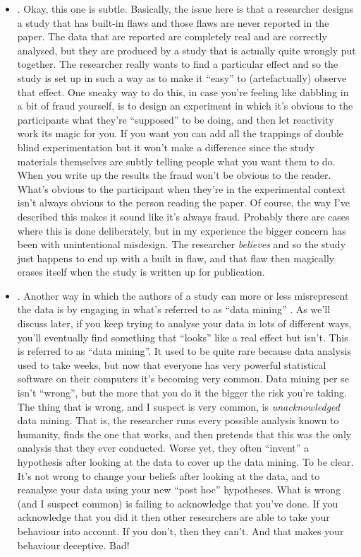 \begin{itemize}
\item {}. Okay, this one is subtle. Basically, the issue here is that a researcher designs a study that has built-in flaws and those flaws are never reported in the paper. The data that are reported are completely real and are correctly analysed, but they are produced by a study that is actually quite wrongly put together. The researcher really wants to find a particular effect and so the study is set up in such a way as to make it ``easy'' to (artefactually) observe that effect. One sneaky way to do this, in case you're feeling like dabbling in a bit of fraud yourself, is to design an experiment in which it's  obvious to the participants what they're ``supposed'' to be doing, and then let reactivity work its magic for you. If you want you can add all the trappings of double blind experimentation but it won't make a difference since the study materials themselves are subtly telling people what you want them to do. When you write up the results the fraud won't be obvious to the reader. What's obvious to the participant when they're in the experimental context isn't always obvious to the person reading the paper. Of course, the way I've described this makes it sound like it's always fraud. Probably there are cases where this is done deliberately, but in my experience the bigger concern has been with unintentional misdesign. The researcher {\it believes} and so the study just happens to end up with a built in flaw, and that flaw then magically erases itself when the study is written up for publication.
\item {}. Another way in which the authors of a study can more or less misrepresent the data is by engaging in what's referred to as ``data mining'' \parencite[see][for a broader discussion of this as part of the ``garden of forking paths'' in statistical analysis]{Gelman2014}. As we'll discuss later, if you keep trying to analyse your data in lots of different ways, you'll eventually find something that ``looks'' like a real effect but isn't. This is referred to as ``data mining''. It used to be quite rare because data analysis used to take weeks, but now that everyone has very powerful statistical software on their computers it's becoming very common. Data mining per se isn't ``wrong'', but the more that you do it the bigger the risk you're taking. The thing that is wrong, and I suspect is very common, is {\it unacknowledged} data mining. That is, the researcher runs every possible analysis known to humanity, finds the one that works, and then pretends that this was the only analysis that they ever conducted. Worse yet, they often ``invent'' a hypothesis after looking at the data to cover up the data mining. To be clear. It's not wrong to change your beliefs after looking at the data, and to reanalyse your data using your new ``post hoc'' hypotheses. What is wrong (and I suspect common) is failing to acknowledge that you've done. If you acknowledge that you did it then other researchers are able to take your behaviour into account. If you don't, then they can't. And that makes your behaviour deceptive. Bad! 

\end{itemize}

